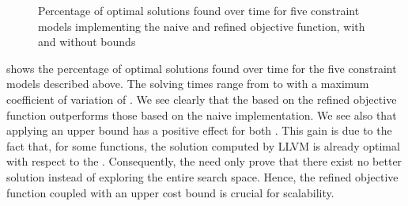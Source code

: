 \begin{figure}
  \renewcommand{\plotPercentageFont}{\large}
  \renewcommand{\plotSecondsFont}{\large}
  \centering%

  \caption[%
            Plot for evaluating the refined objective function's impact on
            finding optimal solutions%
          ]%
          {%
            Percentage of optimal solutions found over time for five constraint
            models implementing the naive and refined objective function, with
            and without bounds%
          }
\end{figure}



 shows the
percentage of optimal \glspl{solution} found over time for the five
\glspl{constraint model} described above.
%
The solving times range from
\SIMinOf{
  \ObjFunRefinedVsNaiveOptProofsOverTimeNaiveNoBoundsSolvingTimeAvgMin,
  \ObjFunRefinedVsNaiveOptProofsOverTimeNaiveWUbSolvingTimeAvgMin,
  \ObjFunRefinedVsNaiveOptProofsOverTimeRefinedNoBoundsSolvingTimeAvgMin,
  \ObjFunRefinedVsNaiveOptProofsOverTimeRefinedWUbSolvingTimeAvgMin,
  \ObjFunRefinedVsNaiveOptProofsOverTimeRefinedWLbUbSolvingTimeAvgMin
}{\s} to
\SIMaxOf[round-precision=0]{
  \ObjFunRefinedVsNaiveOptProofsOverTimeNaiveNoBoundsSolvingTimeAvgMax,
  \ObjFunRefinedVsNaiveOptProofsOverTimeNaiveWUbSolvingTimeAvgMax,
  \ObjFunRefinedVsNaiveOptProofsOverTimeRefinedNoBoundsSolvingTimeAvgMax,
  \ObjFunRefinedVsNaiveOptProofsOverTimeRefinedWUbSolvingTimeAvgMax,
  \ObjFunRefinedVsNaiveOptProofsOverTimeRefinedWLbUbSolvingTimeAvgMax
}{\s}
with a maximum coefficient of variation of
\numMaxOf{
  \ObjFunRefinedVsNaiveOptProofsOverTimeNaiveNoBoundsSolvingTimeCvMax,
  \ObjFunRefinedVsNaiveOptProofsOverTimeNaiveWUbSolvingTimeCvMax,
  \ObjFunRefinedVsNaiveOptProofsOverTimeRefinedNoBoundsSolvingTimeCvMax,
  \ObjFunRefinedVsNaiveOptProofsOverTimeRefinedWUbSolvingTimeCvMax,
  \ObjFunRefinedVsNaiveOptProofsOverTimeRefinedWLbUbSolvingTimeCvMax
}.
%
We see clearly that the  based on the refined
\gls{objective function} outperforms those based on the naive implementation.
%
We see also that applying an upper bound has a positive effect for both
.
%
This gain is due to the fact that, for some \glspl{function}, the \gls{solution}
computed by \gls{LLVM} is already optimal with respect to the
.
%
Consequently, the  need only prove that there exist
no better \gls{solution} instead of exploring the entire \gls{search space}.
%
Hence, the refined \gls{objective function} coupled with an upper cost bound is
crucial for scalability.

